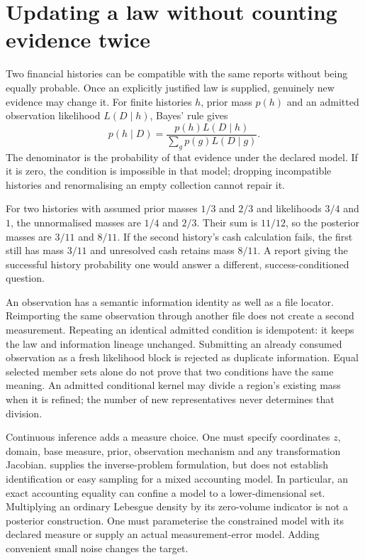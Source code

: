 \section{Updating a law without counting evidence twice}
\label{sec:inference}

Two financial histories can be compatible with the same reports without being
equally probable. Once an explicitly justified law is supplied, genuinely new
evidence may change it. For finite histories $h$, prior mass $p(h)$ and an
admitted observation likelihood $L(D\mid h)$, Bayes' rule gives
\[
 p(h\mid D)=\frac{p(h)L(D\mid h)}{\sum_g p(g)L(D\mid g)}.
\]
The denominator is the probability of that evidence under the declared model.
If it is zero, the condition is impossible in that model; dropping incompatible
histories and renormalising an empty collection cannot repair it.

For two histories with assumed prior masses $1/3$ and $2/3$ and likelihoods
$3/4$ and $1$, the unnormalised masses are $1/4$ and $2/3$. Their sum is $11/12$,
so the posterior masses are $3/11$ and $8/11$. If the second history's cash
calculation fails, the first still has mass $3/11$ and unresolved cash retains
mass $8/11$. A report giving the successful history probability one would
answer a different, success-conditioned question.

An observation has a semantic information identity as well as a file locator.
Reimporting the same observation through another file does not create a second
measurement. Repeating an identical admitted condition is idempotent: it keeps
the law and information lineage unchanged. Submitting an already consumed
observation as a fresh likelihood block is rejected as duplicate information.
Equal selected member sets alone do not prove that two conditions have the same
meaning. An admitted conditional kernel may divide a region's existing mass
when it is refined; the number of new representatives never determines that
division.

Continuous inference adds a measure choice. One must specify coordinates $z$,
domain, base measure, prior, observation mechanism and any transformation
Jacobian. \citet[Section 2.2, equations (2.5)--(2.8)]{stuart2010} supplies the
inverse-problem formulation, but does not establish identification or easy
sampling for a mixed accounting model. In particular, an exact accounting
equality can confine a model to a lower-dimensional set. Multiplying an ordinary
Lebesgue density by its zero-volume indicator is not a posterior construction.
One must parameterise the constrained model with its declared measure or supply
an actual measurement-error model. Adding convenient small noise changes the
target.

